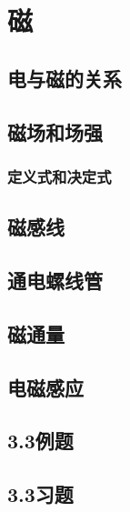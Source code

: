 \section{磁}
\subsection{电与磁的关系} 
\subsection{磁场和场强}
\subsubsection{定义式和决定式}
\subsection{磁感线}
\subsection{通电螺线管}
\subsection{磁通量}
\subsection{电磁感应}
\subsection{3.3例题}
\subsection{3.3习题}